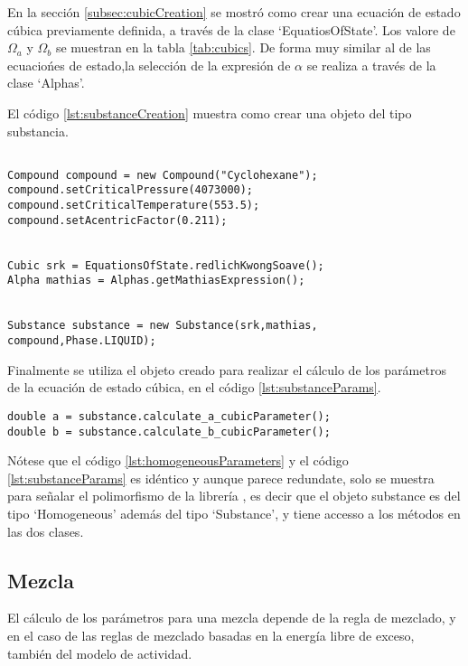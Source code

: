 En la sección \ref{subsec:cubicCreation} se mostró como crear una ecuación de estado cúbica previamente definida, a través de la clase `EquatiosOfState'. Los valore de $\Omega_a$ y $\Omega_b$ se muestran en la tabla \ref{tab:cubics}. De forma muy similar al de las ecuaciońes de estado,la selección de la expresión de $\alpha$ se realiza a través de la clase `Alphas'.

El código \ref{lst:substanceCreation} muestra como crear una objeto del tipo substancia.

\begin{lstlisting}[caption={Creación de un objeto tipo `Substance' para el compuesto Ciclohexano, con la ecuación de estado Soave Redlich Kwong y la expresión de $\alpha$ de mathias },label={lst:substanceCreation}]

Compound compound = new Compound("Cyclohexane");
compound.setCriticalPressure(4073000);
compound.setCriticalTemperature(553.5);
compound.setAcentricFactor(0.211);


Cubic srk = EquationsOfState.redlichKwongSoave();
Alpha mathias = Alphas.getMathiasExpression();


Substance substance = new Substance(srk,mathias, compound,Phase.LIQUID);
\end{lstlisting}

	Finalmente se utiliza el objeto creado para realizar el cálculo de los parámetros de la ecuación de estado cúbica, en el código \ref{lst:substanceParams}.

\begin{lstlisting}[caption={Cálculo de los parámetros para la ecuación de estado cúbica con la clase `Substance'.},label={lst:substanceParams}]
double a = substance.calculate_a_cubicParameter();
double b = substance.calculate_b_cubicParameter();
\end{lstlisting}
 

Nótese que el código \ref{lst:homogeneousParameters} y el código \ref{lst:substanceParams} es idéntico y aunque parece redundate, solo se muestra para señalar el polimorfismo de la librería , es decir que el objeto substance es del tipo `Homogeneous' además del tipo `Substance', y tiene accesso a los métodos en las dos clases.


\subsection{Mezcla}\label{subsec:mixture}

El cálculo de los parámetros para una mezcla depende de la regla de mezclado, y en el caso de las reglas de mezclado basadas en la energía libre de exceso, también del modelo de actividad.

